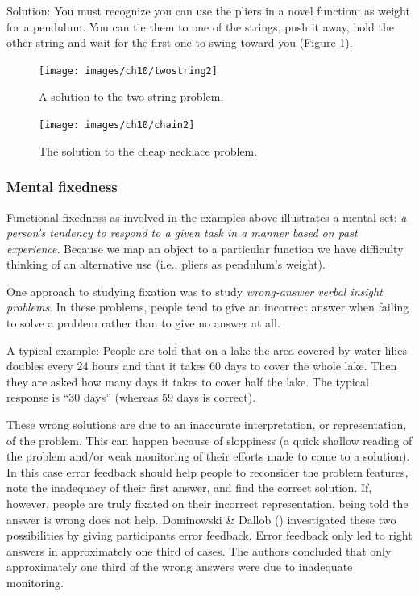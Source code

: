 \documentclass[
]{krantz}
\begin{document}
Solution: You must recognize you can use the pliers in a novel function: as weight for a pendulum. You can tie them to one of the strings, push it away, hold the other string and wait for the first one to swing toward you (Figure \ref{fig:twostring2}).

\begin{figure}

{\centering \texttt{[image: images/ch10/twostring2]} 

}

\caption{A solution to the two-string problem.}\label{fig:twostring2}
\end{figure}

\begin{figure}

{\centering \texttt{[image: images/ch10/chain2]} 

}

\caption{The solution to the cheap necklace problem.}\label{fig:chain2}
\end{figure}

\subsubsection*{Mental fixedness}\label{mental-fixedness}


Functional fixedness as involved in the examples above illustrates a \hyperref[mental-set]{mental set}: \emph{a person's tendency to respond to a given task in a manner based on past experience}. Because we map an object to a particular function we have difficulty thinking of an alternative use (i.e., pliers as pendulum's weight).

One approach to studying fixation was to study \emph{wrong-answer verbal insight problems}. In these problems, people tend to give an incorrect answer when failing to solve a problem rather than to give no answer at all.

A typical example: People are told that on a lake the area covered by water lilies doubles every 24 hours and that it takes 60 days to cover the whole lake. Then they are asked how many days it takes to cover half the lake. The typical response is ``30 days'' (whereas 59 days is correct).

These wrong solutions are due to an inaccurate interpretation, or representation, of the problem. This can happen because of sloppiness (a quick shallow reading of the problem and/or weak monitoring of their efforts made to come to a solution). In this case error feedback should help people to reconsider the problem features, note the inadequacy of their first answer, and find the correct solution. If, however, people are truly fixated on their incorrect representation, being told the answer is wrong does not help. Dominowski \& Dallob () investigated these two possibilities by giving participants error feedback. Error feedback only led to right answers in approximately one third of cases. The authors concluded that only approximately one third of the wrong answers were due to inadequate monitoring.
\end{document}
